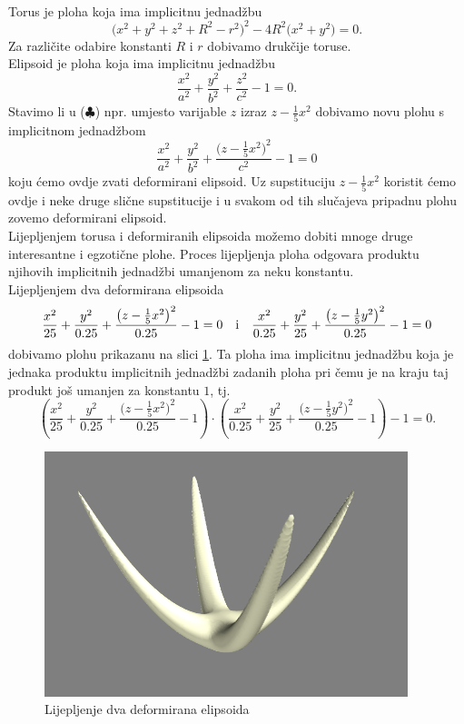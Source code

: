 \documentclass[a4paper,12pt]{article}
\theoremstyle{zad}
\begin{document}
\begin{center}
\\[2pt]
\end{center}
\bigskip
Torus je ploha koja ima implicitnu jednad\v{z}bu
$$\big(x^2+y^2+z^2+R^2-r^2\big)^2-4R^2\big(x^2+y^2\big)=0.$$
Za razli\v{c}ite odabire konstanti $R$ i $r$ dobivamo druk\v{c}ije toruse.\\[8pt]
Elipsoid je ploha koja ima implicitnu jednadžbu
\begin{equation*}
\frac{x^2}{a^2}+\frac{y^2}{b^2}+\frac{z^2}{c^2}-1=0.\tag{$\clubsuit$}
\end{equation*}
Stavimo li u ($\clubsuit$) npr. umjesto varijable $z$ izraz $z-\frac{1}{5}x^2$ dobivamo novu plohu s implicitnom jednadžbom
\begin{equation*}
\frac{x^2}{a^2}+\frac{y^2}{b^2}+\frac{\big(z-\frac{1}{5}x^2\big)^2}{c^2}-1=0
\end{equation*}
koju ćemo ovdje zvati deformirani elipsoid. Uz supstituciju $z-\frac{1}{5}x^2$ koristit ćemo ovdje i neke druge slične supstitucije i
u svakom od tih slučajeva pripadnu plohu zovemo deformirani elipsoid.\\[8pt]
Lijepljenjem torusa i deformiranih elipsoida možemo dobiti mnoge druge interesantne i egzotične plohe.
Proces lijepljenja ploha odgovara produktu njihovih implicitnih jednad\v{z}bi umanjenom za neku konstantu.\\[8pt]
Lijepljenjem dva deformirana elipsoida
\begin{gather*}
\frac{x^2}{25}+\frac{y^2}{0.25}+\frac{\big(z-\frac{1}{5}x^2\big)^2}{0.25}-1=0\text{\quad i\quad}
\frac{x^2}{0.25}+\frac{y^2}{25}+\frac{\big(z-\frac{1}{5}y^2\big)^2}{0.25}-1=0
\end{gather*}
dobivamo plohu prikazanu na slici \ref{sl1}.
Ta ploha ima implicitnu jednadžbu koja je jednaka produktu implicitnih jednadžbi zadanih ploha pri 
čemu je na kraju taj produkt još umanjen za konstantu $1$, tj.
$$\left(\frac{x^2}{25}+\frac{y^2}{0.25}+\frac{\big(z-\frac{1}{5}x^2\big)^2}{0.25}-1\right)\cdot
\left(\frac{x^2}{0.25}+\frac{y^2}{25}+\frac{\big(z-\frac{1}{5}y^2\big)^2}{0.25}-1\right)-1=0.$$
\begin{figure}[!h]
\centering
\includegraphics[scale=0.3]{cand1.png}
\vspace*{-5pt}
\caption{Lijepljenje dva deformirana elipsoida}\label{sl1}
\end{figure}
\pagebreak
\end{document}

